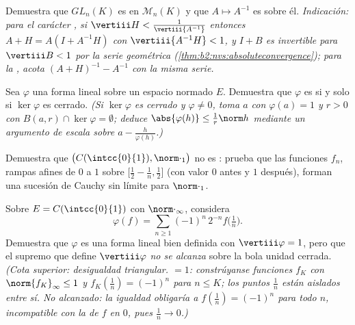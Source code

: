 \begin{exercise}[$\star\star$]\label{exo:b2:nvs:5}
Demuestra que $GL_n(K)$ es  en $\mathcal{M}_n(K)$ y que $A
\mapsto A^{-1}$ es  sobre él. \emph{Indicación: para el
carácter , si $\vertiii H < \frac{1}{\vertiii{A^{-1}}}$
entonces $A + H = A(I + A^{-1}H)$ con $\vertiii{A^{-1}H} < 1$, y $I
+ B$ es invertible para $\vertiii B < 1$ por la serie geométrica
(\cref{thm:b2:nvs:absoluteconvergence}); para la , acota
$(A+H)^{-1} - A^{-1}$ con la misma serie.}
\end{exercise}

\begin{exercise}[$\star\star$]\label{exo:b2:nvs:6}
Sea $\varphi$ una forma lineal sobre un espacio normado $E$.
Demuestra que $\varphi$ es  si y solo si $\ker\varphi$ es
cerrado. \emph{(Si $\ker\varphi$ es cerrado y $\varphi \neq 0$, toma
$a$ con $\varphi(a) = 1$ y $r > 0$ con $B(a, r) \cap \ker\varphi =
\emptyset$; deduce $\abs{\varphi(h)} \leq \frac{1}{r}\norm h$
mediante un argumento de escala sobre $a -
\frac{h}{\varphi(h)}$.)}
\end{exercise}

\begin{exercise}[$\star\star$]\label{exo:b2:nvs:7}
Demuestra que $\bigl(C(\intcc{0}{1}), \norm\cdot_1\bigr)$ no es
: prueba que las funciones $f_n$, rampas afines de $0$ a
$1$ sobre $\bigl[\frac12 - \frac1n, \frac12\bigr]$ (con valor $0$
antes y $1$ después), forman una sucesión de Cauchy sin límite
 para $\norm\cdot_1$.
\end{exercise}

\begin{exercise}[$\star\star\star$]\label{exo:b2:nvs:8}
Sobre $E = C(\intcc{0}{1})$ con $\norm\cdot_\infty$, considera
\[
\varphi(f) = \sum_{n \geq 1} (-1)^n\, 2^{-n} f\bigl(\tfrac1n\bigr).
\]
Demuestra que $\varphi$ es una forma lineal  bien definida
con $\vertiii\varphi = 1$, pero que el supremo que define
$\vertiii\varphi$ \emph{no se alcanza} sobre la bola unidad cerrada.
\emph{(Cota superior: desigualdad triangular.  $= 1$:
constrúyanse funciones  $f_K$ con $\norm{f_K}_\infty \leq
1$ y $f_K(\frac1n) = (-1)^n$ para $n \leq K$; los puntos $\frac1n$
están aislados entre sí. No alcanzado: la igualdad obligaría a
$f(\frac1n) = (-1)^n$ para todo $n$, incompatible con la
 de $f$ en $0$, pues $\frac1n \to 0$.)}
\end{exercise}

